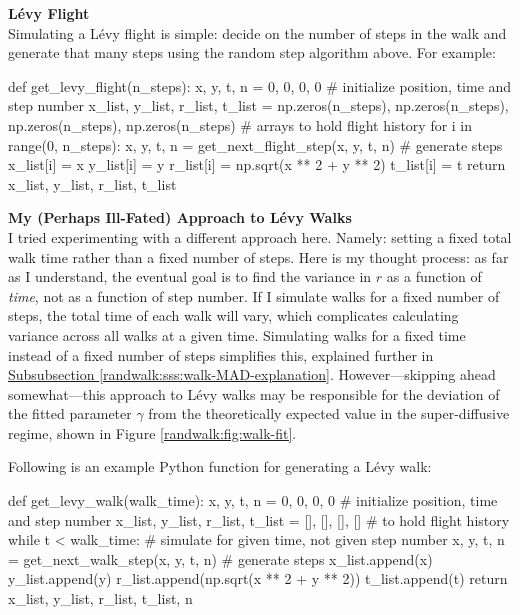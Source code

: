 \documentclass[11pt, a4paper]{article}
\newcommand{\lev}{L\'evy\xspace}
\begin{document}
\vspace{2mm}
\textbf{\lev Flight}\\[1mm]
Simulating a \lev flight is simple: decide on the number of steps in the walk and generate that many steps using the random step algorithm above. For example:
\begin{myminted}
def get_levy_flight(n_steps):
    x, y, t, n = 0, 0, 0, 0  # initialize position, time and step number
    x_list, y_list, r_list, t_list = np.zeros(n_steps), np.zeros(n_steps), np.zeros(n_steps), np.zeros(n_steps)  # arrays to hold flight history
    for i in range(0, n_steps):
        x, y, t, n = get_next_flight_step(x, y, t, n)  # generate steps
        x_list[i] = x
        y_list[i] = y
        r_list[i] = np.sqrt(x ** 2 + y ** 2)
        t_list[i] = t
    return x_list, y_list, r_list, t_list
\end{myminted}
\textbf{My (Perhaps Ill-Fated) Approach to \lev Walks}\\[2mm]
I tried experimenting with a different approach here. Namely: setting a fixed total walk time rather than a fixed number of steps. Here is my thought process: as far as I understand, the eventual goal is to find the variance in $ r $ as a function of \textit{time}, not as a function of step number. If I simulate walks for a fixed number of steps, the total time of each walk will vary, which complicates calculating variance across all walks at a given time. Simulating walks for a fixed time instead of a fixed number of steps simplifies this, explained further in \hyperref[randwalk:sss:walk-MAD-explanation]{Subsubsection \ref{randwalk:sss:walk-MAD-explanation}}. However---skipping ahead somewhat---this approach to \lev walks may be responsible for the deviation of the fitted parameter $ \gamma $ from the theoretically expected value in the super-diffusive regime, shown in Figure \ref{randwalk:fig:walk-fit}.

\vspace{2mm}
Following is an example Python function for generating a \lev walk:
\begin{myminted}
def get_levy_walk(walk_time):
    x, y, t, n = 0, 0, 0, 0  # initialize position, time and step number
    x_list, y_list, r_list, t_list = [], [], [], []  # to hold flight history
    while t < walk_time:  # simulate for given time, not given step number
        x, y, t, n = get_next_walk_step(x, y, t, n)  # generate steps
        x_list.append(x)
        y_list.append(y)
        r_list.append(np.sqrt(x ** 2 + y ** 2))
        t_list.append(t)
    return x_list, y_list, r_list, t_list, n
\end{myminted}
\end{document}
